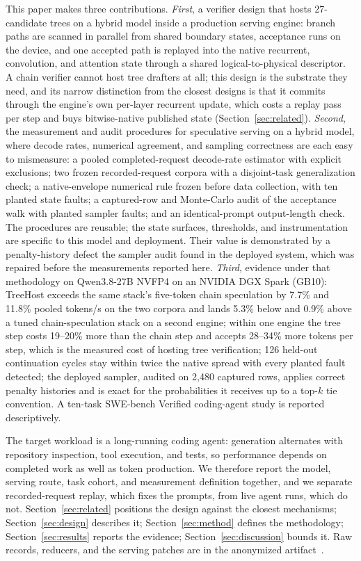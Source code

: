 \documentclass[sigconf,anonymous,review]{acmart}
\newcommand{\sys}{TreeHost}
\begin{document}
This paper makes three contributions. \textit{First}, a verifier design that hosts 27-candidate trees on a hybrid model inside a production serving engine: branch paths are scanned in parallel from shared boundary states, acceptance runs on the device, and one accepted path is replayed into the native recurrent, convolution, and attention state through a shared logical-to-physical descriptor. A chain verifier cannot host tree drafters at all; this design is the substrate they need, and its narrow distinction from the closest designs is that it commits through the engine's own per-layer recurrent update, which costs a replay pass per step and buys bitwise-native published state (Section~\ref{sec:related}). \textit{Second}, the measurement and audit procedures for speculative serving on a hybrid model, where decode rates, numerical agreement, and sampling correctness are each easy to mismeasure: a pooled completed-request decode-rate estimator with explicit exclusions; two frozen recorded-request corpora with a disjoint-task generalization check; a native-envelope numerical rule frozen before data collection, with ten planted state faults; a captured-row and Monte-Carlo audit of the acceptance walk with planted sampler faults; and an identical-prompt output-length check. The procedures are reusable; the state surfaces, thresholds, and instrumentation are specific to this model and deployment. Their value is demonstrated by a penalty-history defect the sampler audit found in the deployed system, which was repaired before the measurements reported here. \textit{Third}, evidence under that methodology on Qwen3.8-27B NVFP4 on an NVIDIA DGX Spark (GB10): \sys{} exceeds the same stack's five-token chain speculation by 7.7\% and 11.8\% pooled tokens/s on the two corpora and lands 5.3\% below and 0.9\% above a tuned chain-speculation stack on a second engine; within one engine the tree step costs 19--20\% more than the chain step and accepts 28--34\% more tokens per step, which is the measured cost of hosting tree verification; 126 held-out continuation cycles stay within twice the native spread with every planted fault detected; the deployed sampler, audited on 2,480 captured rows, applies correct penalty histories and is exact for the probabilities it receives up to a top-$k$ tie convention. A ten-task SWE-bench Verified coding-agent study is reported descriptively.

The target workload is a long-running coding agent: generation alternates with repository inspection, tool execution, and tests, so performance depends on completed work as well as token production. We therefore report the model, serving route, task cohort, and measurement definition together, and we separate recorded-request replay, which fixes the prompts, from live agent runs, which do not. Section~\ref{sec:related} positions the design against the closest mechanisms; Section~\ref{sec:design} describes it; Section~\ref{sec:method} defines the methodology; Section~\ref{sec:results} reports the evidence; Section~\ref{sec:discussion} bounds it. Raw records, reducers, and the serving patches are in the anonymized artifact~\cite{anon2026artifact}.
\end{document}
